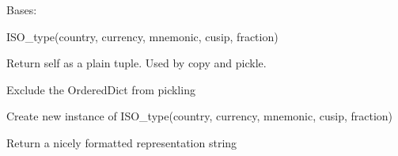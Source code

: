\documentclass[letterpaper,10pt,english]{sphinxmanual}
\begin{document}
\begin{fulllineitems}
\label{api/piecash.model_core.currency_ISO:piecash.model_core.currency_ISO.ISO_type}
Bases: 

ISO\_type(country, currency, mnemonic, cusip, fraction)

\begin{fulllineitems}
\label{api/piecash.model_core.currency_ISO:piecash.model_core.currency_ISO.ISO_type.__getnewargs__}
Return self as a plain tuple.  Used by copy and pickle.

\end{fulllineitems}


\begin{fulllineitems}
\label{api/piecash.model_core.currency_ISO:piecash.model_core.currency_ISO.ISO_type.__getstate__}
Exclude the OrderedDict from pickling

\end{fulllineitems}


\begin{fulllineitems}
\label{api/piecash.model_core.currency_ISO:piecash.model_core.currency_ISO.ISO_type.__new__}
Create new instance of ISO\_type(country, currency, mnemonic, cusip, fraction)

\end{fulllineitems}


\begin{fulllineitems}
\label{api/piecash.model_core.currency_ISO:piecash.model_core.currency_ISO.ISO_type.__repr__}
Return a nicely formatted representation string

\end{fulllineitems}


\end{fulllineitems}
\end{document}
